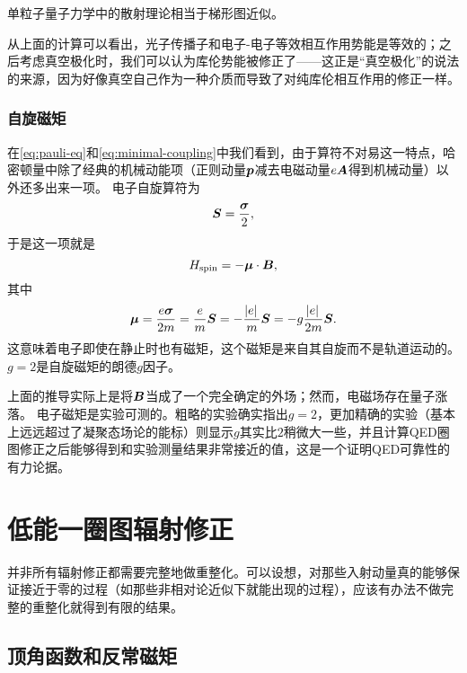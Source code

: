 单粒子量子力学中的散射理论相当于梯形图近似。

从上面的计算可以看出，光子传播子和电子-电子等效相互作用势能是等效的；之后考虑真空极化时，我们可以认为库伦势能被修正了——这正是“真空极化”的说法的来源，因为好像真空自己作为一种介质而导致了对纯库伦相互作用的修正一样。

\subsubsection{自旋磁矩}\label{sec:spin-magnetic-moment}

在\eqref{eq:pauli-eq}和\eqref{eq:minimal-coupling}中我们看到，由于算符不对易这一特点，哈密顿量中除了经典的机械动能项（正则动量$\vb*{p}$减去电磁动量$e \vb*{A}$得到机械动量）以外还多出来一项。
电子自旋算符为
\[
    \vb*{S} = \frac{\vb*{\sigma}}{2},
\]
于是这一项就是
\begin{equation}
    H_\text{spin} = - \vb*{\mu} \cdot \vb*{B}, 
\end{equation}
其中
\begin{equation}
    \vb*{\mu} = \frac{e \vb*{\sigma}}{2m} = \frac{e}{m} \vb*{S} = - \frac{\abs*{e}}{m} \vb*{S} = - g \frac{\abs*{e}}{2m} \vb*{S}.
\end{equation}
这意味着电子即使在静止时也有磁矩，这个磁矩是来自其自旋而不是轨道运动的。$g=2$是自旋磁矩的朗德$g$因子。

上面的推导实际上是将$\vb*{B}$当成了一个完全确定的外场；然而，电磁场存在量子涨落。
电子磁矩是实验可测的。粗略的实验确实指出$g=2$，更加精确的实验（基本上远远超过了凝聚态场论的能标）则显示$g$其实比$2$稍微大一些，并且计算QED圈图修正之后能够得到和实验测量结果非常接近的值，这是一个证明QED可靠性的有力论据。

\section{低能一圈图辐射修正}

并非所有辐射修正都需要完整地做重整化。可以设想，对那些入射动量真的能够保证接近于零的过程（如那些非相对论近似下就能出现的过程），应该有办法不做完整的重整化就得到有限的结果。

\subsection{顶角函数和反常磁矩}\label{sec:abnormal-magnetic}

